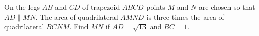 On the legs $AB$ and $CD$ of trapezoid $ABCD$ points $M$ and $N$ are chosen so that $AD\parallel MN$. The area of quadrilateral $AMND$ is three times the area of quadrilateral $BCNM$. Find $MN$ if $AD=\sqrt{13}$ and $BC=1$.
